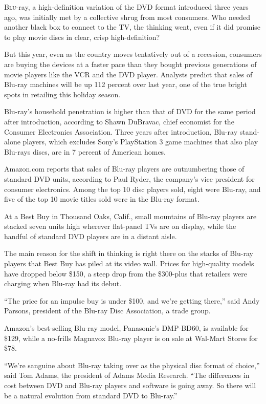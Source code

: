 ﻿\documentclass[12pt]{article}
\begin{document}
\lettrine{B}{lu}-ray, a high-definition variation of the DVD format
introduced three years ago, was initially met by a collective shrug from most consumers. Who needed
another black box to connect to the TV, the thinking went, even if it did promise to play movie
discs in clear, crisp high-definition?

But this year, even as the country moves tentatively out of a recession, consumers are buying the
devices at a faster pace than they bought previous generations of movie players like the VCR and the
DVD player. Analysts predict that sales of Blu-ray machines will be up 112 percent over last year,
one of the true bright spots in retailing this holiday season.

Blu-ray's household penetration is higher than that of DVD for the same period after introduction,
according to Shawn DuBravac, chief economist for the Consumer Electronics Association. Three years
after introduction, Blu-ray stand-alone players, which excludes Sony's PlayStation 3 game machines
that also play Blu-rays discs, are in 7 percent of American homes.

Amazon.com reports that sales of Blu-ray players are outnumbering those of standard DVD units,
according to Paul Ryder, the company's vice president for consumer electronics. Among the top 10
disc players sold, eight were Blu-ray, and five of the top 10 movie titles sold were in the Blu-ray
format.

At a Best Buy in Thousand Oaks, Calif., small mountains of Blu-ray players are stacked seven units
high wherever flat-panel TVs are on display, while the handful of standard DVD players are in a
distant aisle.

The main reason for the shift in thinking is right there on the stacks of Blu-ray players that Best
Buy has piled at its video wall. Prices for high-quality models have dropped below \$150, a steep
drop from the \$300-plus that retailers were charging when Blu-ray had its debut.

``The price for an impulse buy is under \$100, and we're getting there,'' said Andy Parsons,
president of the Blu-ray Disc Association, a trade group.

Amazon's best-selling Blu-ray model, Panasonic's DMP-BD60, is available for \$129, while a no-frills
Magnavox Blu-ray player is on sale at Wal-Mart Stores for \$78.

``We're sanguine about Blu-ray taking over as the physical disc format of choice,'' said Tom Adams,
the president of Adams Media Research. ``The differences in cost between DVD and Blu-ray players and
software is going away. So there will be a natural evolution from standard DVD to Blu-ray.''
\end{document}
